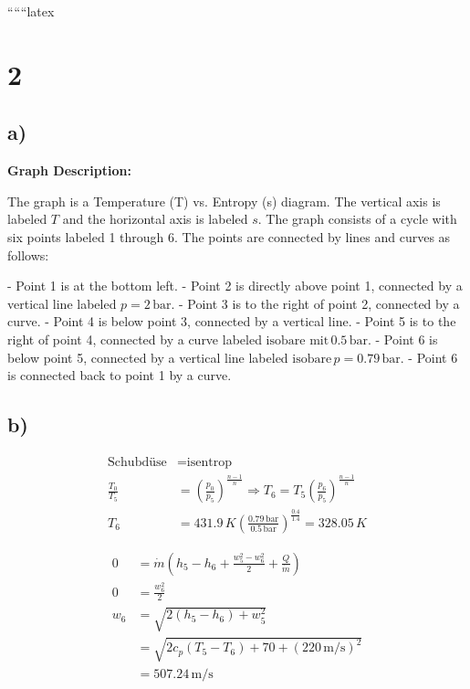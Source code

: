 
``````latex


\section*{2}

\subsection*{a)}

\begin{center}
\textbf{Graph Description:}
\end{center}

The graph is a Temperature (T) vs. Entropy (s) diagram. The vertical axis is labeled \( T \) and the horizontal axis is labeled \( s \). The graph consists of a cycle with six points labeled 1 through 6. The points are connected by lines and curves as follows:

- Point 1 is at the bottom left.
- Point 2 is directly above point 1, connected by a vertical line labeled \( p = 2 \, \text{bar} \).
- Point 3 is to the right of point 2, connected by a curve.
- Point 4 is below point 3, connected by a vertical line.
- Point 5 is to the right of point 4, connected by a curve labeled \( \text{isobare mit} \, 0.5 \, \text{bar} \).
- Point 6 is below point 5, connected by a vertical line labeled \( \text{isobare} \, p = 0.79 \, \text{bar} \).
- Point 6 is connected back to point 1 by a curve.

\subsection*{b)}

\begin{align*}
\text{Schubdüse} & = \text{isentrop} \\
\frac{T_0}{T_5} & = \left( \frac{p_0}{p_5} \right)^{\frac{n-1}{n}} \Rightarrow T_6 = T_5 \left( \frac{p_6}{p_5} \right)^{\frac{n-1}{n}} \\
T_6 & = 431.9 \, K \left( \frac{0.79 \, \text{bar}}{0.5 \, \text{bar}} \right)^{\frac{0.4}{1.4}} = 328.05 \, K
\end{align*}


\begin{align*}
0 & = \dot{m} (h_5 - h_6 + \frac{w_5^2 - w_6^2}{2} + \frac{Q}{\dot{m}}) \\
0 & = \frac{w_6^2}{2} \\
w_6 & = \sqrt{2 (h_5 - h_6) + w_5^2} \\
& = \sqrt{2 c_p (T_5 - T_6) + 70 + (220 \, \text{m/s})^2} \\
& = 507.24 \, \text{m/s}
\end{align*}

